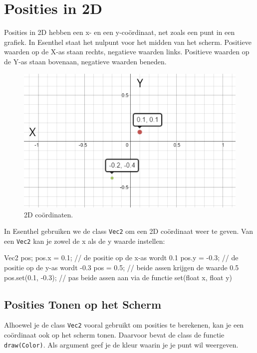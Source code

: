 \chapter{Posities in 2D}
\label{chapter:positions}

Posities in 2D hebben een x- en een y-co\"ordinaat, net zoals een punt in een grafiek. In Esenthel staat het nulpunt voor het midden van het scherm. Positieve waarden op de X-as staan rechts, negatieve waarden links. Positieve waarden op de Y-as staan bovenaan, negatieve waarden beneden.

\begin{figure}[h]
\centering
\includegraphics[width=0.7\linewidth]{../images/2Dpositions}
\caption[]{2D co\"ordinaten.}
\label{fig:pos2D}
\end{figure}

In Esenthel gebruiken we de class \texttt{Vec2} om een 2D co\"ordinaat weer te geven. Van een \texttt{Vec2} kan je zowel de x als de y waarde instellen:

\begin{code}
Vec2 pos;
pos.x =  0.1; // de positie op de x-as wordt 0.1
pos.y = -0.3; // de positie op de y-as wordt -0.3
pos   =  0.5; // beide assen krijgen de waarde 0.5
pos.set(0.1, -0.3); // pas beide assen aan via de functie set(float x, float y)
\end{code}

\section{Posities Tonen op het Scherm}

Alhoewel je de class \texttt{Vec2} vooral gebruikt om posities te berekenen, kan je een co\"ordinaat ook op het scherm tonen. Daarvoor bevat de class de functie \texttt{draw(Color)}. Als argument geef je de kleur waarin je je punt wil weergeven. 

